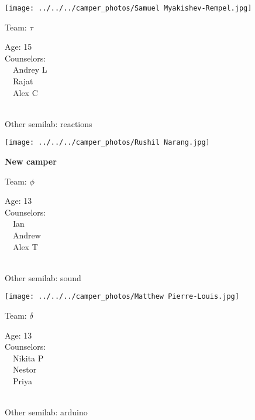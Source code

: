 \documentclass[10pt,letterpaper, landscape]{article}
\begin{document}
\horizontalshiftfornextsticker
\renewcommand{\baselinestretch}{1} \begin{sticker}
\noindent\begin{minipage}{0.5\textwidth}\texttt{[image: ../../../camper\_photos/Samuel Myakishev-Rempel.jpg]}\end{minipage}\begin{minipage}{0.45\textwidth}
Team: {\Large $\tau$}

Age:        15\\
Counselors: \\\ \ Andrey L\\\ \ Rajat\\\ \ Alex C\\
\end{minipage} \\ \vspace{0.07in}
Other semilab: reactions
\end{sticker}
\horizontalshiftfornextsticker
\renewcommand{\baselinestretch}{1} \begin{sticker}
\noindent\begin{minipage}{0.5\textwidth}\texttt{[image: ../../../camper\_photos/Rushil Narang.jpg]}\end{minipage}\begin{minipage}{0.45\textwidth}
\textbf{New camper} 

Team: {\Large $\phi$}

Age:        13\\
Counselors: \\\ \ Ian\\\ \ Andrew\\\ \ Alex T\\
\end{minipage} \\ \vspace{0.07in}
Other semilab: sound
\end{sticker}
\horizontalshiftfornextsticker
\renewcommand{\baselinestretch}{1} \begin{sticker}
\noindent\begin{minipage}{0.5\textwidth}\texttt{[image: ../../../camper\_photos/Matthew Pierre-Louis.jpg]}\end{minipage}\begin{minipage}{0.45\textwidth}
Team: {\Large $\delta$}

Age:        13\\
Counselors: \\\ \ Nikita P\\\ \ Nestor\\\ \ Priya\\
\end{minipage} \\ \vspace{0.07in}
Other semilab: arduino
\end{sticker}
\end{document}
